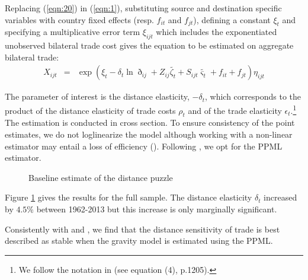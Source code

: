 \documentclass[12pt,twoside,a4paper,notitlepage]{article}
\begin{document}
Replacing (\ref{eqn:20}) in (\ref{eqn:1}), substituting source and destination specific variables with country fixed effects (resp. $f_{it}$ and $f_{jt}$), defining a constant $\xi_t$ and specifying a multiplicative error term $\xi_{ijt}$ which includes the exponentiated unobserved bilateral trade cost gives the equation to be estimated on aggregate bilateral trade: 
\begin{eqnarray}
X_{ijt}&=&\exp{\left(\xi_t-\delta_{t}\ln{\eth_{ij}}+{Z_{ij}}\tilde{\zeta_{t}}+{S_{ijt}}\tilde{\varsigma_{t}}+f_{it}+f_{jt}\right)\eta_{ijt}} \label{eqn:4}
\end{eqnarray}

The parameter of interest is the distance elasticity, $-\delta_t$, which corresponds to the product of the distance elasticity of trade costs $\rho_t$ and of the trade elasticity $\epsilon_t$.\footnote{We follow the notation in \cite{Head2013} (see equation (4), p.1205).} 
The estimation is conducted in cross section. 
To ensure consistency of the point estimates, we do not loglinearize the model although working with a non-linear estimator may entail a loss of efficiency (\cite{Manning1999}).
Following \cite{SantosSilva2006}, we opt for the PPML estimator.

\begin{figure}[h!]
	\caption{Baseline estimate of the distance puzzle \label{fig:DP_baseline}}
	\begin{center}
		\setlength{\fboxrule}{1pt} %
		\setlength{\fboxsep}{.1in} %
	\end{center}
\end{figure}

Figure \ref{fig:DP_baseline} gives the results for the full sample.
The distance elasticity $\delta_t$ increased by $4.5$\% between 1962-2013 but this increase is only marginally significant.

Consistently with \cite{Head2013} and \cite{Bosquet2015}, we find that the distance sensitivity of trade is best described as stable when the gravity model is estimated using the PPML.
\end{document}
